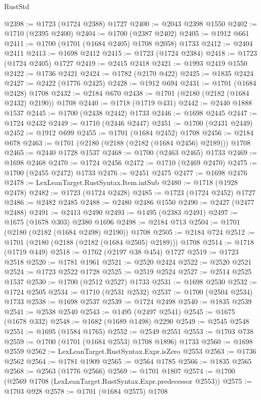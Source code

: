 \begin{lexlean}{RustStd}
\begin{coremodule}
@2398 := @1723 (@1724 @2388) @1727
@2400 := @2043 @2398 @1550
@2402 := @1710 (@2395 @2400)
@2404 := @1700 (@2387 @2402)
@2405 := @1912 @661
@2411 := @1700 (@1701 (@1684 @2405) @1708 @2058) @1733
@2412 := @2404 @2411
@2413 := @1698 @2412
@2415 := @1723 (@1724 @2384)
@2418 := @1723 (@1724 @2405) @1727
@2419 := @2415 @2418
@2421 := @1993 @2419 @1550
@2422 := @1736 @2421
@2424 := @1782 (@2170 @422)
@2425 := @1835 @2424
@2427 := @2422 (@1776 @2425)
@2428 := @1912 @694
@2431 := @1701 (@1684 @2428) @1708
@2432 := @2184 @670
@2438 := @1701 (@2180 (@2182 (@1684 @2432) @2190)) @1708
@2440 := @1718 (@1719 @431)
@2442 := @2440 @1888 @1537
@2445 := @1700 (@2438 @2442) @1733
@2446 := @1698 @2445
@2447 := @1724 @2432
@2449 := @1710 (@2446 @2447)
@2451 := @1700 (@2431 @2449)
@2452 := @1912 @699
@2455 := @1701 (@1684 @2452) @1708
@2456 := @2184 @678
@2463 := @1701 (@2180 (@2188 (@2182 (@1684 @2456) @2189))) @1708
@2465 := @2440 @1728 @1537
@2468 := @1700 (@2463 @2465) @1733
@2469 := @1698 @2468
@2470 := @1724 @2456
@2472 := @1710 (@2469 @2470)
@2475 := @1700 (@2455 @2472) @1733
@2476 := @2451 @2475
@2477 := @1698 @2476
@2478 := LexLeanTarget.RustSyntax.Item.intSub
@2480 := @1718 (@1928 @2478)
@2482 := @1723 (@1724 @2428)
@2485 := @1723 (@1724 @2452) @1727
@2486 := @2482 @2485
@2488 := @2480 @2486 @1550
@2490 := @2427 (@2477 @2488)
@2491 := @2413 @2490
@2493 := @1495 (@2383 @2491)
@2497 := @1675 (@1678 @303) @2380 @1696
@2498 := @2184 @713
@2504 := @1701 (@2180 (@2182 (@1684 @2498) @2190)) @1708
@2505 := @2184 @724
@2512 := @1701 (@2180 (@2188 (@2182 (@1684 @2505) @2189))) @1708
@2514 := @1718 (@1719 @449)
@2518 := @1762 (@2197 @38 @454) @1727
@2519 := @1723 @2518
@2520 := @1781 @1961
@2521 := @2520 @2424
@2522 := @2520 @2521
@2524 := @1723 @2522 @1728
@2525 := @2519 @2524
@2527 := @2514 @2525 @1537
@2530 := @1700 (@2512 @2527) @1733
@2531 := @1698 @2530
@2532 := @1724 @2505
@2534 := @1710 (@2531 @2532)
@2537 := @1700 (@2504 @2534) @1733
@2538 := @1698 @2537
@2539 := @1724 @2498
@2540 := @1835 @2539
@2541 := @2538 @2540
@2543 := @1495 (@2497 @2541)
@2545 := @1675 (@1678 @332)
@2548 := @1682 (@1689 @1498) @2290
@2549 := @2545 @2548
@2551 := @1695 (@1584 @1765)
@2552 := @2549 @2551
@2553 := @1703 @738
@2559 := @1700 (@1701 (@1684 @2553) @1708 @1896) @1733
@2560 := @1698 @2559
@2562 := LexLeanTarget.RustSyntax.Expr.isZero @2553
@2563 := @1736 @2562
@2564 := @1781 @1909
@2565 := @2564 @1785
@2566 := @1835 @2565
@2568 := @2563 (@1776 @2566)
@2569 := @1701 @1807
@2574 := @1700 (@2569 @1708 (LexLeanTarget.RustSyntax.Expr.predecessor @2553))
@2575 := @1703 @928
@2578 := @1701 (@1684 @2575) @1708

\end{coremodule}
\end{lexlean}
